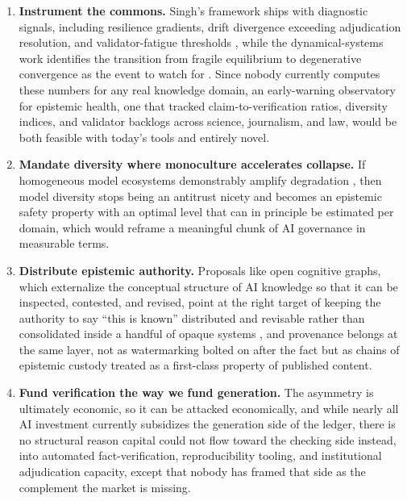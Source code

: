 \documentclass[11pt,letterpaper]{article}
\begin{document}
\begin{enumerate}[leftmargin=1.4em, itemsep=0.4em]
\item \textbf{Instrument the commons.} Singh's framework ships with diagnostic signals, including resilience gradients, drift divergence exceeding adjudication resolution, and validator-fatigue thresholds \citep{singh}, while the dynamical-systems work identifies the transition from fragile equilibrium to degenerative convergence as the event to watch for \citep{coevolution}. Since nobody currently computes these numbers for any real knowledge domain, an early-warning observatory for epistemic health, one that tracked claim-to-verification ratios, diversity indices, and validator backlogs across science, journalism, and law, would be both feasible with today's tools and entirely novel.

\item \textbf{Mandate diversity where monoculture accelerates collapse.} If homogeneous model ecosystems demonstrably amplify degradation \citep{diversity-mitigates}, then model diversity stops being an antitrust nicety and becomes an epistemic safety property with an optimal level that can in principle be estimated per domain, which would reframe a meaningful chunk of AI governance in measurable terms.

\item \textbf{Distribute epistemic authority.} Proposals like open cognitive graphs, which externalize the conceptual structure of AI knowledge so that it can be inspected, contested, and revised, point at the right target of keeping the authority to say ``this is known'' distributed and revisable rather than consolidated inside a handful of opaque systems \citep{ocg}, and provenance belongs at the same layer, not as watermarking bolted on after the fact but as chains of epistemic custody treated as a first-class property of published content.

\item \textbf{Fund verification the way we fund generation.} The asymmetry is ultimately economic, so it can be attacked economically, and while nearly all AI investment currently subsidizes the generation side of the ledger, there is no structural reason capital could not flow toward the checking side instead, into automated fact-verification, reproducibility tooling, and institutional adjudication capacity, except that nobody has framed that side as the complement the market is missing.
\end{enumerate}
\end{document}
